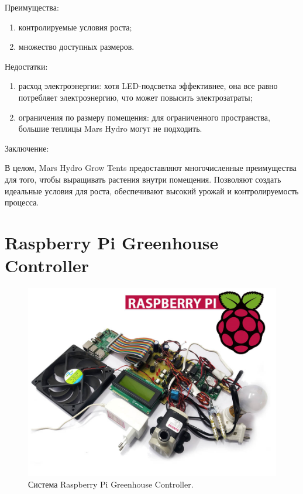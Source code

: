 Преимущества:

\begin{enumerate}
    \item контролируемые условия роста;
    \item множество доступных размеров.
\end{enumerate}

Недостатки:

\begin{enumerate}
    \item расход электроэнергии: хотя LED-подсветка эффективнее, она все равно потребляет электроэнергию, что может повысить электрозатраты;
    \item ограничения по размеру помещения: для ограниченного пространства, большие теплицы Mars Hydro могут не подходить.
\end{enumerate}

Заключение:

В целом, Mars Hydro Grow Tents предоставляют многочисленные преимущества для того, чтобы выращивать растения внутри помещения. Позволяют создать идеальные условия для роста, обеспечивают высокий урожай и контролируемость процесса. 

\section{Raspberry Pi Greenhouse Controller}

\begin{figure}[H]
    \centering
    \includegraphics[scale=0.4]{images/RaspberryPiGreenhouseController.png}
    \caption{Система Raspberry Pi Greenhouse Controller.}
    \label{fig:RaspberryPiGreenhouseController}
\end{figure}

